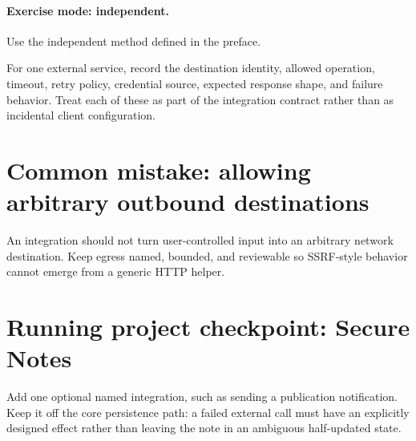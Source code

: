 \paragraph{Exercise mode: independent.} Use the independent method defined in the preface.

For one external service, record the destination identity, allowed operation, timeout, retry policy, credential source, expected response shape, and failure behavior. Treat each of these as part of the integration contract rather than as incidental client configuration.

\section{Common mistake: allowing arbitrary outbound destinations}
An integration should not turn user-controlled input into an arbitrary network destination. Keep egress named, bounded, and reviewable so SSRF-style behavior cannot emerge from a generic HTTP helper.

\section{Running project checkpoint: Secure Notes}
Add one optional named integration, such as sending a publication notification. Keep it off the core persistence path: a failed external call must have an explicitly designed effect rather than leaving the note in an ambiguous half-updated state.
